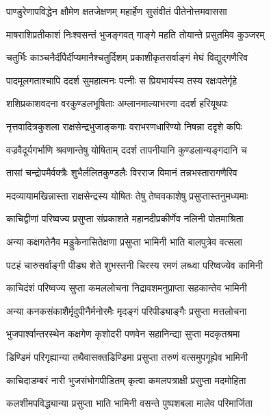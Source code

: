 \twolineshloka
{पाण्डुरेणापविद्धेन क्षौमेण क्षतजेक्षणम्}
{महार्हेण सुसंवीतं पीतेनोत्तमवाससा} %

\twolineshloka
{माषराशिप्रतीकाशं निःश्वसन्तं भुजङ्गवत्}
{गाङ्गे महति तोयान्ते प्रसुतमिव कुञ्जरम्} %

\twolineshloka
{चतुर्भिः काञ्चनैर्दीपैर्दीप्यमानैश्चतुर्दिशम्}
{प्रकाशीकृतसर्वाङ्गं मेघं विद्युद्गणैरिव} %

\twolineshloka
{पादमूलगताश्चापि ददर्श सुमहात्मनः}
{पत्नीः स प्रियभार्यस्य तस्य रक्षःपतेर्गृहे} %

\twolineshloka
{शशिप्रकाशवदना वरकुण्डलभूषिताः}
{अम्लानमाल्याभरणा ददर्श हरियूथपः} %

\twolineshloka
{नृत्तवादित्रकुशला राक्षसेन्द्रभुजाङ्कगाः}
{वराभरणधारिण्यो निषन्ना ददृशे कपिः} %

\twolineshloka
{वज्रवैदूर्यगर्भाणि श्रवणान्तेषु योषिताम्}
{ददर्श तापनीयानि कुण्डलान्यङ्गदानि च} %

\twolineshloka
{तासां चन्द्रोपमैर्वक्त्रैः शुभैर्ललितकुण्डलैः}
{विरराज विमानं तन्नभस्तारागणैरिव} %

\twolineshloka
{मदव्यायामखिन्नास्ता राक्षसेन्द्रस्य योषितः}
{तेषु तेष्ववकाशेषु प्रसुप्तास्तनुमध्यमाः} %

\twolineshloka
{काचिद्वीणां परिष्वज्य प्रसुप्ता संप्रकाशते}
{महानदीप्रकीर्णेव नलिनी पोतमाश्रिता} %

\twolineshloka
{अन्या कक्षगतेनैव मड्डुकेनासितेक्षणा}
{प्रसुप्ता भामिनी भाति बालपुत्रेव वत्सला} %

\twolineshloka
{पटहं चारुसर्वाङ्गी पीड्य शेते शुभस्तनी}
{चिरस्य रमणं लब्ध्वा परिष्वज्येव कामिनी} %

\twolineshloka
{काचिदंशं परिष्वज्य सुप्ता कमललोचना}
{निद्रावशमनुप्राप्ता सहकान्तेव भामिनी} %

\twolineshloka
{अन्या कनकसंकाशैर्मृदुपीनैर्मनोरमैः}
{मृदङ्गं परिपीड्याङ्गैः प्रसुप्ता मत्तलोचना} %

\twolineshloka
{भुजपार्श्वान्तरस्थेन कक्षगेण कृशोदरी}
{पणवेन सहानिन्द्या सुप्ता मदकृतश्रमा} %

\twolineshloka
{डिण्डिमं परिगृह्यान्या तथैवासक्तडिण्डिमा}
{प्रसुप्ता तरुणं वत्समुपगूह्येव भामिनी} %

\twolineshloka
{काचिदाडम्बरं नारी भुजसंभोगपीडितम्}
{कृत्वा कमलपत्राक्षी प्रसुप्ता मदमोहिता} %

\twolineshloka
{कलशीमपविद्ध्यान्या प्रसुप्ता भाति भामिनी}
{वसन्ते पुष्पशबला मालेव परिमार्जिता} %

